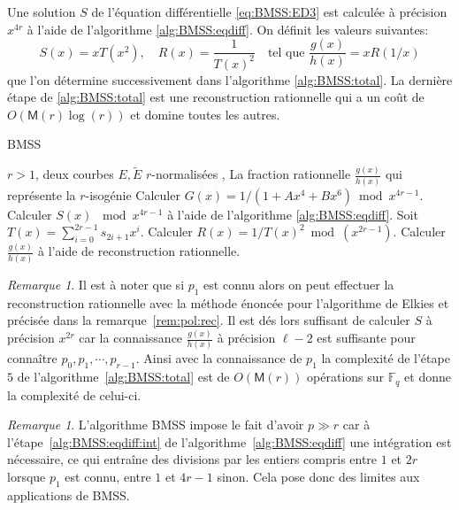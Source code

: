 \documentclass[10pt,a4paper]{book}
\theoremstyle{plain}
\theoremstyle{definition}
\theoremstyle{definition}
\theoremstyle{definition}
\theoremstyle{definition}
\theoremstyle{remark}
\newtheorem{rem}[thm]{Remarque}
\theoremstyle{remark}
\theoremstyle{definition}
\begin{document}
Une solution $S$ de l'équation différentielle \eqref{eq:BMSS:ED3} est calculée à précision $x^{4r}$ à l'aide de l'algorithme \ref{alg:BMSS:eqdiff}. On définit les valeurs suivantes:
\begin{equation}
S(x)=xT(x^2), \quad R(x)=\frac{1}{T(x)^2} \quad \text{tel que } \frac{g(x)}{h(x)}=xR(1/x)
\end{equation}
que l'on détermine successivement dans l'algorithme \ref{alg:BMSS:total}. La dernière étape de \ref{alg:BMSS:total} est une reconstruction rationnelle qui a un coût de $O(\mathsf{M}(r)\log(r))$ \cite[11]{vzGJG03} et domine toutes les autres.

\begin{algorithm}
\caption{\label{alg:BMSS:total} BMSS}
\begin{algorithmic}[1]
\REQUIRE $r>1$, deux courbes $E,\tilde{E}$ $r$-normalisées  ,%
\ENSURE La fraction rationnelle $\frac{g(x)}{h(x)}$ qui représente la $r$-isogénie
\STATE Calculer $G(x)=1/(1+Ax^4+Bx^6) \bmod x^{4r-1}$.
\STATE \label{alg:BMSS:total:eqdiff} Calculer $S(x)$ $\bmod x^{4r-1}$ à l'aide de l'algorithme \ref{alg:BMSS:eqdiff}.
\STATE Soit $T(x)=\sum_{i=0}^{2r-1}s_{2i+1}x^i$.
\STATE Calculer $R(x)=1/T(x)^2 \bmod(x^{2r-1})$.
\STATE Calculer $\frac{g(x)}{h(x)}$ à l'aide de reconstruction rationnelle. 
\end{algorithmic}
\end{algorithm}

\begin{rem}
Il est à noter que si $p_1$ est connu alors on peut effectuer la reconstruction
rationnelle avec la méthode énoncée pour l'algorithme de Elkies et précisée 
dans la remarque~\ref{rem:pol:rec}. Il est dés lors suffisant de calculer $S$ à
précision $x^{2r}$ car la connaissance $\frac{g(x)}{h(x)}$ à précision 
$\ell-2$ est suffisante pour connaître $p_0,p_1,\cdots ,p_{r-1}$. Ainsi avec
la connaissance de $p_1$ la complexité de l'étape $5$ de 
l'algorithme~\ref{alg:BMSS:total} est de $O(\mathsf{M}(r))$ opérations sur 
$\mathbb{F}_q$ et donne la complexité de celui-ci.
\end{rem}

\begin{rem}
L'algorithme BMSS impose le fait d'avoir $p \gg r$ car à 
l'étape~\ref{alg:BMSS:eqdiff:int} de l'algorithme~\ref{alg:BMSS:eqdiff} une 
intégration est nécessaire, ce qui entraîne des divisions par les entiers 
compris entre $1$ et $2r$ lorsque $p_1$ est connu, entre $1$ et $4r-1$ 
sinon. Cela pose donc des limites aux applications de BMSS.
\end{rem}
\end{document}
